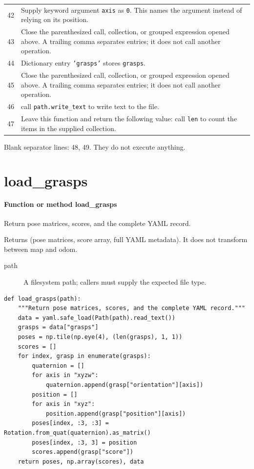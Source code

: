 \documentclass[11pt,a4paper]{book}
\begin{document}
\begin{longtable}{r p{}}
42 & Supply keyword argument \texttt{axis} as \texttt{0}. This names the argument instead of relying on its position. \\

43 & Close the parenthesized call, collection, or grouped expression opened above. A trailing comma separates entries; it does not call another operation. \\

44 & Dictionary entry \texttt{'grasps'} stores \texttt{grasps}. \\

45 & Close the parenthesized call, collection, or grouped expression opened above. A trailing comma separates entries; it does not call another operation. \\

46 & call \texttt{path.write\_text} to write text to the file. \\

47 & Leave this function and return the following value: call \texttt{len} to count the items in the supplied collection. \\

\end{longtable}

Blank separator lines: 48, 49. They do not execute anything.

\section{load\_grasps}

\paragraph{Function or method load\_grasps}
Return pose matrices, scores, and the complete YAML record.

Returns (pose matrices, score array, full YAML metadata). It does not transform between map and odom.

\begin{description}
\item[path] A filesystem path; callers must supply the expected file type.
\end{description}

\begin{lstlisting}[firstnumber=50]
def load_grasps(path):
    """Return pose matrices, scores, and the complete YAML record."""
    data = yaml.safe_load(Path(path).read_text())
    grasps = data["grasps"]
    poses = np.tile(np.eye(4), (len(grasps), 1, 1))
    scores = []
    for index, grasp in enumerate(grasps):
        quaternion = []
        for axis in "xyzw":
            quaternion.append(grasp["orientation"][axis])
        position = []
        for axis in "xyz":
            position.append(grasp["position"][axis])
        poses[index, :3, :3] = Rotation.from_quat(quaternion).as_matrix()
        poses[index, :3, 3] = position
        scores.append(grasp["score"])
    return poses, np.array(scores), data
\end{lstlisting}
\end{document}
